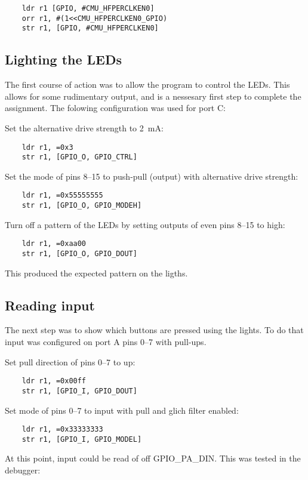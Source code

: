 \begin{verbatim}
    ldr r1 [GPIO, #CMU_HFPERCLKEN0]
    orr r1, #(1<<CMU_HFPERCLKEN0_GPIO)
    str r1, [GPIO, #CMU_HFPERCLKEN0]
\end{verbatim}


\subsection{Lighting the LEDs}
The first course of action was to allow the program to control the LEDs.
This allows for some rudimentary output, and is a nessesary first step to complete the assignment.
The folowing configuration was used for port C:

Set the alternative drive strength to \SI{2}{\milli\ampere}:
\begin{verbatim}
    ldr r1, =0x3
    str r1, [GPIO_O, GPIO_CTRL]
\end{verbatim}

Set the mode of pins 8--15 to push-pull (output) with alternative drive strength:
\begin{verbatim}
    ldr r1, =0x55555555
    str r1, [GPIO_O, GPIO_MODEH]
\end{verbatim}

Turn off a pattern of the LEDs by setting outputs of even pins 8--15 to high:
\begin{verbatim}
    ldr r1, =0xaa00
    str r1, [GPIO_O, GPIO_DOUT]
\end{verbatim}

This produced the expected pattern on the ligths.


\subsection{Reading input}
The next step was to show which buttons are pressed using the lights.
To do that input was configured on port A pins 0--7 with pull-ups.

Set pull direction of pins 0--7 to up:
\begin{verbatim}
    ldr r1, =0x00ff
    str r1, [GPIO_I, GPIO_DOUT]
\end{verbatim}

Set mode of pins 0--7 to input with pull and glich filter enabled:
\begin{verbatim}
    ldr r1, =0x33333333
    str r1, [GPIO_I, GPIO_MODEL]
\end{verbatim}

At this point, input could be read of off GPIO\_PA\_DIN.
This was tested in the debugger:

